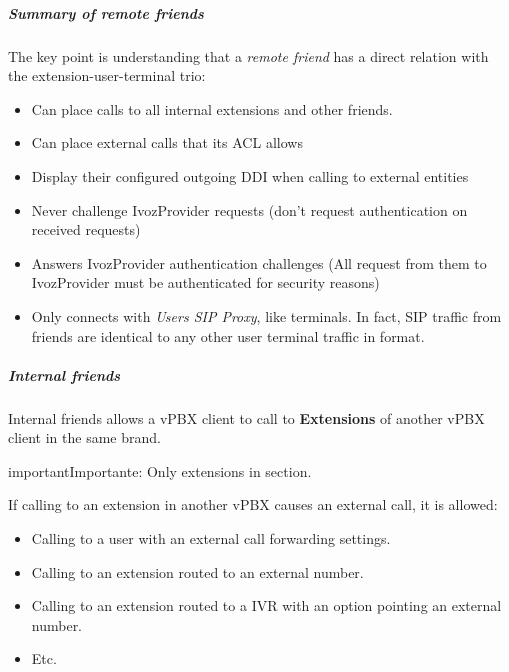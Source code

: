 \documentclass[letterpaper,10pt,spanish]{sphinxmanual}
\begin{document}
\subparagraph{Summary of remote friends}
\label{administration_portal/client/vpbx/routing_endpoints/friends/remote_friends:summary-of-remote-friends}
The key point is understanding that a \emph{remote friend} has a direct relation with the
extension-user-terminal trio:
\begin{itemize}
\item {} 
Can place calls to all internal extensions and other friends.

\item {} 
Can place external calls that its ACL allows

\item {} 
Display their configured outgoing DDI when calling to external entities

\item {} 
Never challenge IvozProvider requests (don't request authentication on received requests)

\item {} 
Answers IvozProvider authentication challenges (All request from them to
IvozProvider must be authenticated for security reasons)

\item {} 
Only connects with \emph{Users SIP Proxy}, like terminals. In fact, SIP traffic from
friends are identical to any other user terminal traffic in format.

\end{itemize}


\subparagraph{Internal friends}
\label{administration_portal/client/vpbx/routing_endpoints/friends/internal_friends::doc}\label{administration_portal/client/vpbx/routing_endpoints/friends/internal_friends:internal-friends}
Internal friends allows a vPBX client to call to \textbf{Extensions} of another vPBX client in the same brand.

\begin{notice}{important}{Importante:}
Only extensions in {\hyperref[administration_portal/client/vpbx/extensions:extensions]{}} section.
\end{notice}

If calling to an extension in another vPBX causes an external call, it is allowed:
\begin{itemize}
\item {} 
Calling to a user with an external call forwarding settings.

\item {} 
Calling to an extension routed to an external number.

\item {} 
Calling to an extension routed to a IVR with an option pointing an external number.

\item {} 
Etc.

\end{itemize}
\end{document}
